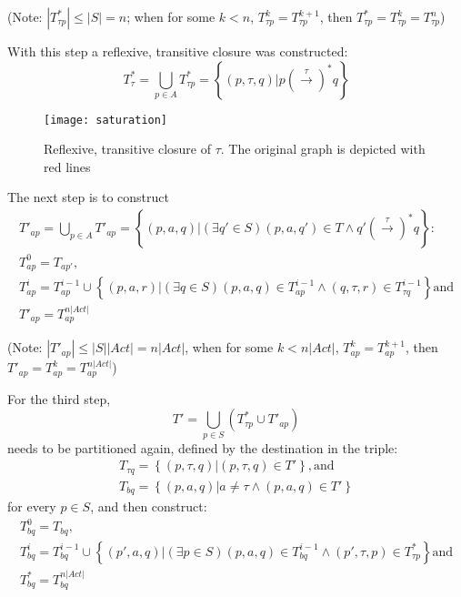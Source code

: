 (Note: ${\left|T^{*}_{\tau p}\right|\leq\left|S\right|=n}$; when for some ${k<n}$, ${T^{k}_{\tau p}=T^{k+1}_{\tau p}}$, then ${T^{*}_{\tau p}=T^{k}_{\tau p}=T^{n}_{\tau p}}$)

With this step a reflexive, transitive closure was constructed:
\begin{equation*}
	{T^{*}_{\tau}=\bigcup_{p\in A}T^{*}_{\tau p}=\left\{\left(p,\tau,q\right)|p\left(\stackrel{\tau}{\rightarrow}\right)^{*}q\right\}}
\end{equation*}

\begin{figure}[!ht]
\centering
\texttt{[image: saturation]}
\caption{Reflexive, transitive closure of $\tau$. The original graph is depicted with red lines}
\label{fig:saturation}
\end{figure}

The next step is to construct 
\begin{equation}
	\begin{array}{lcl}
		T'_{ap}=\bigcup_{p\in A}T'_{ap}=\left\{\left(p,a,q\right)|\left(\exists q'\in S\right)\left(p,a,q'\right)\in T\wedge q'\left(\stackrel{\tau}{\rightarrow}\right)^{*}q\right\}:\\
		T^{0}_{ap}=T_{ap'},\\
		T^{i}_{ap}=T^{i-1}_{ap}\cup \left\{\left(p,a,r\right)|\left(\exists q\in S\right)\left(p,a,q\right)\in T^{i-1}_{ap}\wedge \left(q,\tau,r\right)\in T^{i-1}_{\tau q}\right\} \text{and} \\
		T'_{ap}=T^{n|Act|}_{ap}
	\end{array}
\end{equation}

(Note: $|T'_{ap}|\leq |S||Act|=n|Act|$, when for some $k<n|Act|$, $T^{k}_{ap}=T^{k+1}_{ap}$, then $T'_{ap}=T^{k}_{ap}=T^{n|Act|}_{ap}$)

For the third step, 
\begin{equation*}
	T'=\bigcup_{p\in S}\left(T^{*}_{\tau p}\cup T'_{ap}\right)
\end{equation*}
needs to be partitioned again, defined by the destination in the triple:
\begin{equation*}
	\begin{array}{lcl}
		T_{\tau q}=\left\{\left(p,\tau,q\right)|\left(p,\tau,q\right)\in T'\right\}, \text{and}\\
		T_{bq}=\left\{\left(p,a,q\right)|a\neq\tau\wedge\left(p,a,q\right)\in T'\right\}				    
	\end{array}
\end{equation*}
for every $p\in S$, and then construct:
\begin{equation*}
	\begin{array}{lcl}
		T^{0}_{bq}=T_{bq},\\
		T^{i}_{bq}=T^{i-1}_{bq}\cup\left\{\left(p',a,q\right)|\left(\exists p\in S\right)\left(p,a,q\right)\in T^{i-1}_{bq}\wedge\left(p',\tau,p\right)\in T^{*}_{\tau p}\right\} \text{and}\\
		T^{*}_{bq}=T^{n|Act|}_{bq}
	\end{array}
\end{equation*}

